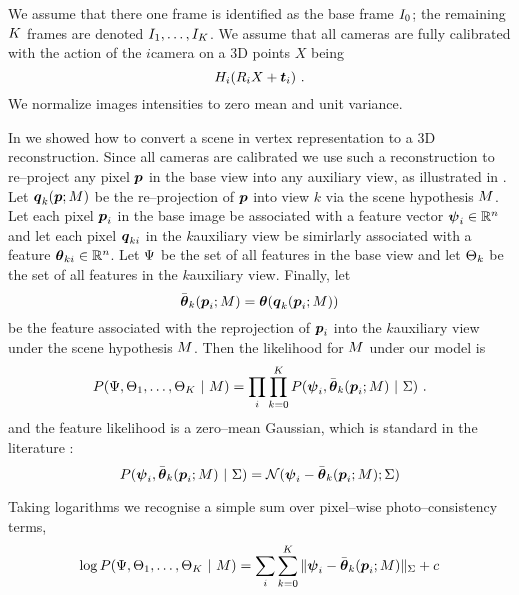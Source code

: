 We assume that there one frame is identified as the base frame
$\Image_0$; the remaining $\NumViews$ frames are denoted
$\Image_1,\ldots,\Image_{\NumViews}$. We assume that all cameras are fully
calibrated with the action of the $i$\th camera on a 3D points $X$
being
\begin{equation}
  \CamMatrix_i (\CamR_i X + \CamTr_i) ~.
\end{equation}
We normalize images intensities to zero mean and unit variance.

In  we showed how to convert a scene in vertex
representation to a 3D reconstruction. Since all cameras are
calibrated we use such a reconstruction to re--project any pixel
$\Pixel$ in the base view into any auxiliary view, as illustrated in
. Let $\AuxPixel_k(\Pixel;\Scene)$ be the
re--projection of $\Pixel$ into view $k$ via the scene hypothesis
$\Scene$. Let each pixel $\Pixel_i$ in the base image be associated
with a feature vector $\Feature_i\in\Reals^n$ and let each pixel
$\AuxPixel_{ki}$ in the $k$\th auxiliary view be simirlarly associated
with a feature $\AuxFeature_{ki}\in\Reals^n$. Let $\Features$ be the
set of all features in the base view and let $\AuxFeatures_k$ be the
set of all features in the $k$\th auxiliary view. Finally, let
\begin{equation}
  \ComputedAuxFeature_k(\Pixel_i;\Scene) =
  \AuxFeature(\AuxPixel_k(\Pixel_i;\Scene))
\end{equation}
be the feature associated with the reprojection of $\Pixel_i$ into the
$k$\th auxiliary view under the scene hypothesis $\Scene$. Then the
likelihood for $\Scene$ under our model is
\begin{equation}
  P(\Features,\AuxFeatures_1,\ldots,\AuxFeatures_K ~|~ \Scene) =
    \prod_i \prod_{k=0}^{\NumViews} 
      P(\Feature_i, \ComputedAuxFeature_k(\Pixel_i;\Scene) ~|~ \StereoModel)~.
\end{equation}
and the feature likelihood is a zero--mean Gaussian, which is standard in
the literature \cite{Scharstein01}:
\begin{equation}
  P(\Feature_i, \ComputedAuxFeature_k(\Pixel_i;\Scene) ~|~ \StereoModel)
   = \NormalDistr(\Feature_i-\ComputedAuxFeature_k(\Pixel_i;\Scene); \StereoModel)
\end{equation}

Taking logarithms we recognise a simple sum over pixel--wise
photo--consistency terms,
\begin{equation}
  \label{eq:stereo-loglik}
  \log P(\Features,\AuxFeatures_1,\ldots,\AuxFeatures_{\NumViews}
            ~|~ \Scene) =
  \sum_i \sum_{k=0}^{\NumViews} 
    \|\Feature_i-\ComputedAuxFeature_k(\Pixel_i;\Scene)\|_{\StereoModel}
   +c
\end{equation}


